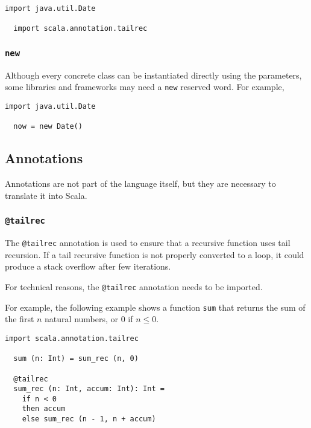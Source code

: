 \documentclass[12pt,a4paper]{article}
\makeatletter
\newcommand{\srccode}[1]{\texttt{{#1}}}
\newcommand{\reservedWord}[1]{{\color{blue}\srccode{#1}}\xspace}
\newcommand{\annotation}[1]{{\color{brown}\srccode{#1}}\xspace}
\newcommand{\snew}{\reservedWord{new}}
\newcommand{\stailrec}{\annotation{@tailrec}}
\makeatother
\begin{document}
    \begin{lstlisting}[label={lst:examplePackage}]
  import java.util.Date

  import scala.annotation.tailrec
    \end{lstlisting}

    \subsubsection{\snew}

    Although every concrete class can be instantiated directly using the parameters, some libraries and frameworks may need a \snew reserved word.
    For example,

    \begin{lstlisting}[label={lst:examplePackage}]
  import java.util.Date

  now = new Date()
    \end{lstlisting}

    \subsection{Annotations}

    Annotations are not part of the language itself, but they are necessary to translate it into Scala.

    \subsubsection{\stailrec}

    The \stailrec annotation is used to ensure that a recursive function uses tail recursion.
    If a tail recursive function is not properly converted to a loop, it could produce a stack overflow after few iterations.

    For technical reasons, the \stailrec annotation needs to be imported.

    For example, the following example shows a function \srccode{sum} that returns the sum of the first $n$ natural numbers, or 0 if $n \leq 0$.

    \begin{lstlisting}[label={lst:exampleTailrec}]
  import scala.annotation.tailrec

  sum (n: Int) = sum_rec (n, 0)

  @tailrec
  sum_rec (n: Int, accum: Int): Int =
    if n < 0
    then accum
    else sum_rec (n - 1, n + accum)

    \end{lstlisting}
\end{document}
